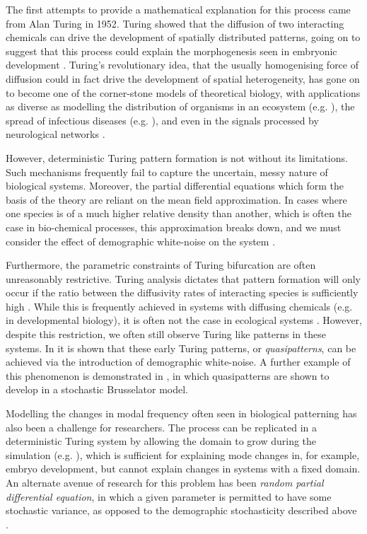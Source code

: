 \documentclass[12pt]{article}
\begin{document}
The first attempts to provide a mathematical explanation for this process came from Alan Turing in 1952. Turing showed that the diffusion of two interacting chemicals can drive the development of spatially distributed patterns, going on to suggest that this process could explain the morphogenesis seen in embryonic development \cite{Turing}. Turing's revolutionary idea, that the usually homogenising force of diffusion could in fact drive the development of spatial heterogeneity, has gone on to become one of the corner-stone models of theoretical biology, with applications as diverse as modelling the distribution of organisms in an ecosystem (e.g. \cite{Wilson}), the spread of infectious diseases (e.g. \cite{Wang}), and even in the signals processed by neurological networks \cite{Froese}.   

However, deterministic Turing pattern formation is not without its limitations. Such mechanisms frequently fail to capture the uncertain, messy nature of biological systems. Moreover, the partial differential equations which form the basis of the theory are reliant on the mean field approximation. In cases where one species is of a much higher relative density than another, which is often the case in bio-chemical processes, this approximation breaks down, and we must consider the effect of demographic white-noise on the system \cite{Dewar}.  

Furthermore, the parametric constraints of Turing bifurcation are often unreasonably restrictive. Turing analysis dictates that pattern formation will only occur if the ratio between the diffusivity rates of interacting species is sufficiently high \cite{Murray}. While this is frequently achieved in systems with diffusing chemicals (e.g. in developmental biology), it is often not the case in ecological systems \cite{Karig, Butler}. However, despite this restriction, we often still observe Turing like patterns in these systems. In \cite{Butler} it is shown that these early Turing patterns, or \textit{quasipatterns}, can be achieved via the introduction of demographic white-noise. A further example of this phenomenon is demonstrated in \cite{Biancalani}, in which quasipatterns are shown to develop in a stochastic Brusselator model.   

Modelling the changes in modal frequency often seen in biological patterning has also been a challenge for researchers. The process can be replicated in a deterministic Turing system by allowing the domain to grow during the simulation (e.g. \cite{Crampin}), which is sufficient for explaining mode changes in, for example, embryo development, but cannot explain changes in systems with a fixed domain. An alternate avenue of research for this problem has been \textit{random partial differential equation}, in which a given parameter is permitted to have some stochastic variance, as opposed to the demographic stochasticity described above \cite{Zhonghuai}.
\end{document}
